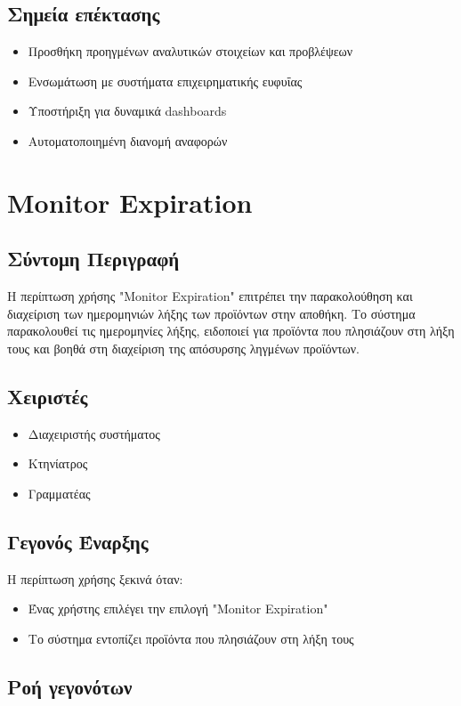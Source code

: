 \documentclass[12pt,a4paper,twoside]{book}
\begin{document}
\subsection{Σημεία επέκτασης}
\begin{itemize}
  \item Προσθήκη προηγμένων αναλυτικών στοιχείων και προβλέψεων
  \item Ενσωμάτωση με συστήματα επιχειρηματικής ευφυΐας
  \item Υποστήριξη για δυναμικά dashboards
  \item Αυτοματοποιημένη διανομή αναφορών
\end{itemize}

\section{Monitor Expiration}

\subsection{Σύντομη Περιγραφή}
Η περίπτωση χρήσης "Monitor Expiration" επιτρέπει την παρακολούθηση και διαχείριση των ημερομηνιών λήξης των προϊόντων στην αποθήκη. Το σύστημα παρακολουθεί τις ημερομηνίες λήξης, ειδοποιεί για προϊόντα που πλησιάζουν στη λήξη τους και βοηθά στη διαχείριση της απόσυρσης ληγμένων προϊόντων. %

\subsection{Χειριστές}
\begin{itemize}
  \item Διαχειριστής συστήματος
  \item Κτηνίατρος
  \item Γραμματέας
\end{itemize}

\subsection{Γεγονός Έναρξης}
Η περίπτωση χρήσης ξεκινά όταν:
\begin{itemize}
  \item Ένας χρήστης επιλέγει την επιλογή "Monitor Expiration" %
  \item Το σύστημα εντοπίζει προϊόντα που πλησιάζουν στη λήξη τους
\end{itemize}

\subsection{Ροή γεγονότων}
\end{document}
